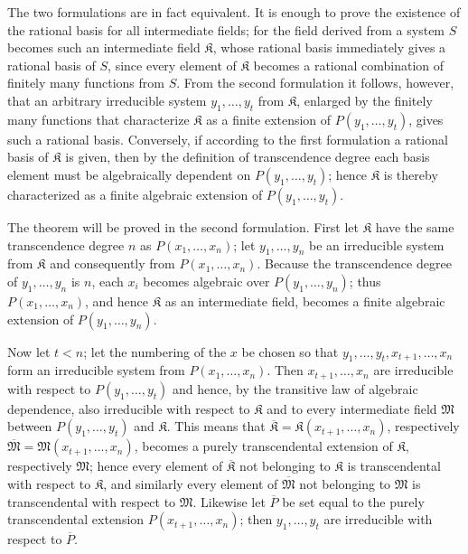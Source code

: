 The two formulations are in fact equivalent. It is enough to prove the existence of the rational basis for all intermediate fields; for the field derived from a system $S$ becomes such an intermediate field $\mathfrak K$, whose rational basis immediately gives a rational basis of $S$, since every element of $\mathfrak K$ becomes a rational combination of finitely many functions from $S$. From the second formulation it follows, however, that an arbitrary irreducible system $y_1,\ldots,y_t$ from $\mathfrak K$, enlarged by the finitely many functions that characterize $\mathfrak K$ as a finite extension of $P(y_1,\ldots,y_t)$, gives such a rational basis. Conversely, if according to the first formulation a rational basis of $\mathfrak K$ is given, then by the definition of transcendence degree each basis element must be algebraically dependent on $P(y_1,\ldots,y_t)$; hence $\mathfrak K$ is thereby characterized as a finite algebraic extension of $P(y_1,\ldots,y_t)$.

The theorem will be proved in the second formulation. First let $\mathfrak K$ have the same transcendence degree $n$ as $P(x_1,\ldots,x_n)$; let $y_1,\ldots,y_n$ be an irreducible system from $\mathfrak K$ and consequently from $P(x_1,\ldots,x_n)$. Because the transcendence degree of $y_1,\ldots,y_n$ is $n$, each $x_i$ becomes algebraic over $P(y_1,\ldots,y_n)$; thus $P(x_1,\ldots,x_n)$, and hence $\mathfrak K$ as an intermediate field, becomes a finite algebraic extension of $P(y_1,\ldots,y_n)$.

Now let $t<n$; let the numbering of the $x$ be chosen so that $y_1,\ldots,y_t,x_{t+1},\ldots,x_n$ form an irreducible system from $P(x_1,\ldots,x_n)$. Then $x_{t+1},\ldots,x_n$ are irreducible with respect to $P(y_1,\ldots,y_t)$ and hence, by the transitive law of algebraic dependence, also irreducible with respect to $\mathfrak K$ and to every intermediate field $\mathfrak M$ between $P(y_1,\ldots,y_t)$ and $\mathfrak K$. This means that $\overline{\mathfrak K}=\mathfrak K(x_{t+1},\ldots,x_n)$, respectively $\overline{\mathfrak M}=\mathfrak M(x_{t+1},\ldots,x_n)$, becomes a purely transcendental extension of $\mathfrak K$, respectively $\mathfrak M$; hence every element of $\overline{\mathfrak K}$ not belonging to $\mathfrak K$ is transcendental with respect to $\mathfrak K$, and similarly every element of $\overline{\mathfrak M}$ not belonging to $\mathfrak M$ is transcendental with respect to $\mathfrak M$. Likewise let $\overline P$ be set equal to the purely transcendental extension $P(x_{t+1},\ldots,x_n)$; then $y_1,\ldots,y_t$ are irreducible with respect to $\overline P$.

